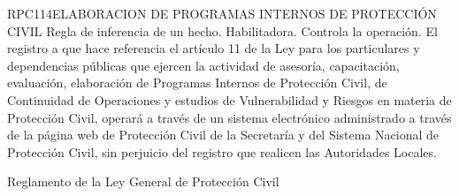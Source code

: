 \begin{BusinessRule}{RPC114}{ELABORACION DE PROGRAMAS INTERNOS DE PROTECCIÓN CIVIL}{
		Regla de inferencia de un hecho.
	}{
		Habilitadora. 
	}{
		Controla la operación. %
	}
	\BRItem[Descripción:] El registro a que hace referencia el artículo 11 de la Ley para los particulares y dependencias públicas que ejercen la actividad de asesoría, capacitación, evaluación, elaboración de Programas Internos de Protección Civil, de Continuidad de Operaciones y estudios de Vulnerabilidad y Riesgos en materia de Protección Civil, operará a través de un sistema electrónico administrado a través de la página web de Protección Civil de la Secretaría y del Sistema Nacional de Protección Civil, sin perjuicio del registro que realicen las Autoridades Locales.
	
	
	 Reglamento de la Ley General de Protección Civil
\end{BusinessRule}